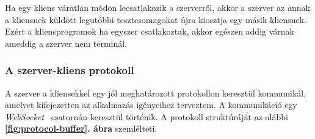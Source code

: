         Ha egy kliens váratlan módon lecsatlakozik a szerverről, akkor a szerver az annak a kliensnek küldött legutóbbi
        tesztcsomagokat újra kiosztja egy másik kliensnek. Ezért a kliensprogramok ha egyszer csatlakoztak, akkor
        egészen addig várnak ameddig a szerver nem terminál.

        \pagebreak
        \subsubsection{A szerver-kliens protokoll}

            A szerver a kliensekkel egy jól meghatározott protokollon keresztül kommunikál, amelyet kifejezetten az
            alkalmazás igényeihez terveztem. A kommunikáció egy \textit{WebSocket}~\cite{websocket} csatornán keresztül
            történik. A protokoll struktúráját az alábbi \textbf{\ref{fig:protocol-buffer}. ábra} szemlélteti.

